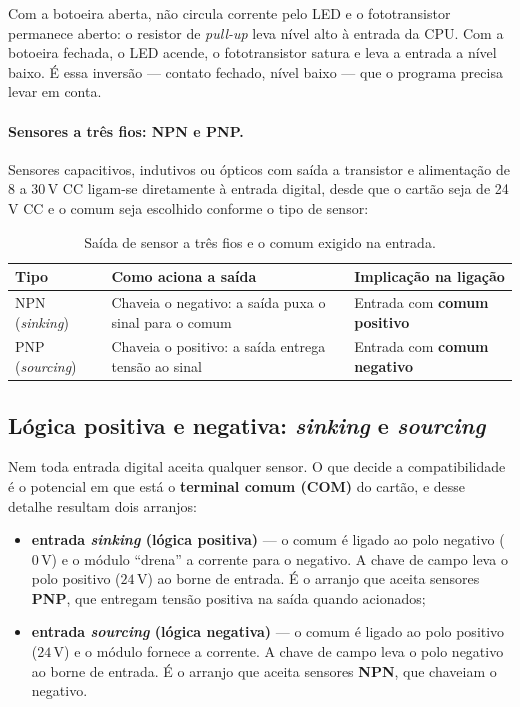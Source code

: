 Com a botoeira aberta, não circula corrente pelo LED e o fototransistor permanece aberto: o
resistor de \emph{pull-up} leva nível alto à entrada da CPU. Com a botoeira fechada, o LED acende, o
fototransistor satura e leva a entrada a nível baixo. É essa inversão --- contato fechado, nível
baixo --- que o programa precisa levar em conta.

\paragraph{Sensores a três fios: NPN e PNP.} Sensores capacitivos, indutivos ou ópticos com saída a
transistor e alimentação de 8 a 30\,V CC ligam-se diretamente à entrada digital, desde que o cartão
seja de 24\,V CC e o comum seja escolhido conforme o tipo de sensor:

\begin{table}[H]
  \centering
  \caption{Saída de sensor a três fios e o comum exigido na entrada.}
  \label{tab:npn-pnp}
  \begin{tabular}{p{2.4cm} p{5.6cm} p{6.4cm}}
    \toprule
    Tipo & Como aciona a saída & Implicação na ligação \\
    \midrule
    NPN (\emph{sinking})
      & Chaveia o negativo: a saída puxa o sinal para o comum
      & Entrada com \textbf{comum positivo} \\
    PNP (\emph{sourcing})
      & Chaveia o positivo: a saída entrega tensão ao sinal
      & Entrada com \textbf{comum negativo} \\
    \bottomrule
  \end{tabular}
\end{table}

\subsection{Lógica positiva e negativa: \emph{sinking} e \emph{sourcing}}

Nem toda entrada digital aceita qualquer sensor. O que decide a compatibilidade é o potencial em que
está o \textbf{terminal comum (COM)} do cartão, e desse detalhe resultam dois arranjos:

\begin{itemize}
  \item \textbf{entrada \emph{sinking} (lógica positiva)} --- o comum é ligado ao polo negativo
        ($0\,$V) e o módulo ``drena'' a corrente para o negativo. A chave de campo leva o polo
        positivo ($24\,$V) ao borne de entrada. É o arranjo que aceita sensores \textbf{PNP}, que
        entregam tensão positiva na saída quando acionados;
  \item \textbf{entrada \emph{sourcing} (lógica negativa)} --- o comum é ligado ao polo positivo
        ($24\,$V) e o módulo fornece a corrente. A chave de campo leva o polo negativo ao borne de
        entrada. É o arranjo que aceita sensores \textbf{NPN}, que chaveiam o negativo.
\end{itemize}

